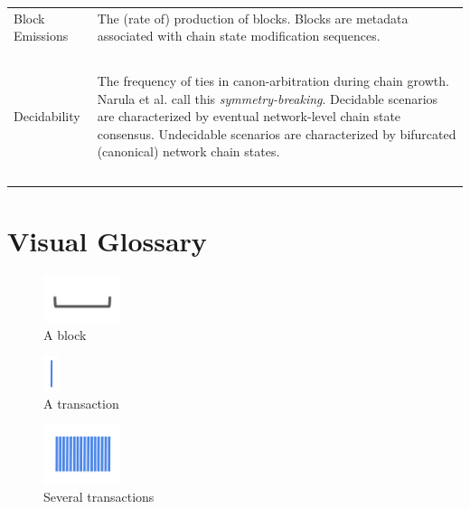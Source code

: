 \documentclass[11pt]{article}
\theoremstyle{plain}
\begin{document}
\begin{table}[H]
{\begin{tabular}{|p{5cm}|p{9cm}|}
Block Emissions &
The (rate of) production of blocks. Blocks are metadata associated with chain state modification sequences.
\\~\\

Decidability &
The frequency of ties in canon-arbitration during chain growth.
Narula et al. call this \emph{symmetry-breaking}.
Decidable scenarios are characterized by eventual network-level chain state consensus.
Undecidable scenarios are characterized by bifurcated (canonical) network chain states.
\\~\\

\hline
\end{tabular}
}
\end{table}



\pagebreak
\section{\normalsize{Visual Glossary}}\label{sec: visual-glossary}

\begin{figure}[tph]
    \centering
    \includegraphics[width=0.2\textwidth]{vis_block.png}
    \caption{A block}
    \label{fig:block}
\end{figure}

\begin{figure}[tph]
    \centering
    \includegraphics[height=1cm]{vis_tx.png}
    \caption{A transaction}
    \label{fig:tx}
\end{figure}

\begin{figure}[tph]
    \centering
    \includegraphics[width=0.2\textwidth]{vis_tx_set.png}
    \caption{Several transactions}
    \label{fig:txs}
\end{figure}
\end{document}
